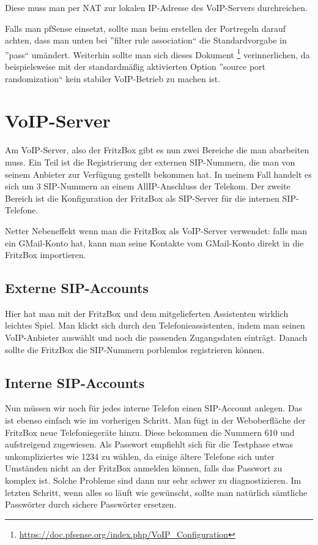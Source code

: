 \documentclass[a4paper,12pt]{scrbook}
\begin{document}
Diese muss man per NAT zur lokalen IP-Adresse des VoIP-Servers durchreichen.

Falls man pfSense einsetzt, sollte man beim erstellen der Portregeln darauf achten, dass man 
unten bei ''filter rule association`` die Standardvorgabe in ''pass`` umändert. Weiterhin sollte man sich
dieses Dokument \footnote{\url{https://doc.pfsense.org/index.php/VoIP_Configuration}} verinnerlichen, da
beispielsweise mit der standardmäßig aktivierten Option ''source port randomization`` kein stabiler VoIP-Betrieb 
zu machen ist.

\section{VoIP-Server}
Am VoIP-Server, also der FritzBox gibt es nun zwei Bereiche die man abarbeiten muss. Ein Teil ist die Registrierung der externen SIP-Nummern,
die man von seinem Anbieter zur Verfügung gestellt bekommen hat. In meinem Fall handelt es sich um 3 SIP-Nummern an einem AllIP-Anschluss der Telekom.
Der zweite Bereich ist die Konfiguration der FritzBox als SIP-Server für die internen SIP-Telefone.

Netter Nebeneffekt wenn man die FritzBox als VoIP-Server verwendet: falls man ein GMail-Konto hat, kann man seine Kontakte vom GMail-Konto direkt in die FritzBox importieren.
\subsection{Externe SIP-Accounts}
Hier hat man mit der FritzBox und dem mitgelieferten Assistenten wirklich leichtes Spiel. Man klickt sich durch den Telefonieassistenten, indem man seinen 
VoIP-Anbieter auswählt und noch die passenden Zugangsdaten einträgt. Danach sollte die FritzBox die SIP-Nummern porblemlos registrieren können. 

\subsection{Interne SIP-Accounts}
Nun müssen wir noch für jedes interne Telefon einen SIP-Account anlegen. Das ist ebenso einfach wie im vorherigen Schritt. Man fügt in der Weboberfläche 
der FritzBox neue Telefoniegeräte hinzu. Diese bekommen die Nummern 610 und aufstreigend zugewiesen. Als Passwort empfiehlt sich für die Testphase etwas 
unkompliziertes wie 1234 zu wählen, da einige ältere Telefone sich unter Umständen nicht an der FritzBox anmelden können, falls das Passwort zu komplex ist.
Solche Probleme sind dann nur sehr schwer zu diagnostizieren. Im letzten Schritt, wenn alles so läuft wie gewünscht, sollte man natürlich sämtliche Passwörter
durch sichere Passwörter ersetzen.
\end{document}
